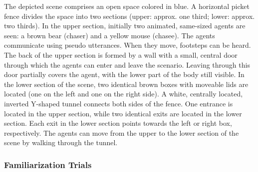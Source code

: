 \documentclass[
  man, donotrepeattitle,floatsintext]{apa6}
\begin{document}
The depicted scene comprises an open space colored in blue. A horizontal picket fence divides the space into two sections (upper: approx. one third; lower: approx. two thirds). In the upper section, initially two animated, same-sized agents are seen: a brown bear (chaser) and a yellow mouse (chasee). The agents communicate using pseudo utterances. When they move, footsteps can be heard. The back of the upper section is formed by a wall with a small, central door through which the agents can enter and leave the scenario. Leaving through this door partially covers the agent, with the lower part of the body still visible. In the lower section of the scene, two identical brown boxes with moveable lids are located (one on the left and one on the right side). A white, centrally located, inverted Y-shaped tunnel connects both sides of the fence. One entrance is located in the upper section, while two identical exits are located in the lower section. Each exit in the lower section points towards the left or right box, respectively. The agents can move from the upper to the lower section of the scene by walking through the tunnel.

\subsubsection{Familiarization Trials}\label{familiarization-trials}
\end{document}
